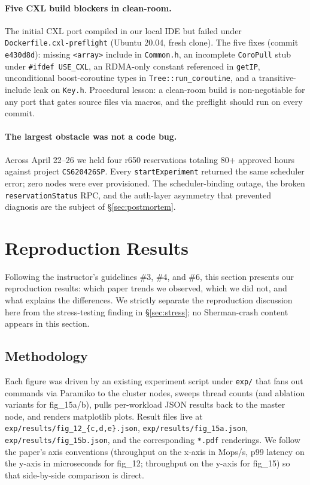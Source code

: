 \documentclass[11pt,a4paper]{article}
\begin{document}
\paragraph{Five CXL build blockers in clean-room.}\label{sec:effort-cxl} The initial CXL port compiled in our local IDE but failed under \texttt{Dockerfile.cxl-preflight} (Ubuntu 20.04, fresh clone). The five fixes (commit \texttt{e430d8d}): missing \texttt{<array>} include in \texttt{Common.h}, an incomplete \texttt{CoroPull} stub under \texttt{\#ifdef USE\_CXL}, an RDMA-only constant referenced in \texttt{getIP}, unconditional boost-coroutine types in \texttt{Tree::run\_coroutine}, and a transitive-include leak on \texttt{Key.h}. Procedural lesson: a clean-room build is non-negotiable for any port that gates source files via macros, and the preflight should run on every commit.

\paragraph{The largest obstacle was not a code bug.} Across April 22--26 we held four r650 reservations totaling 80+ approved hours against project \texttt{CS620426SP}. Every \texttt{startExperiment} returned the same scheduler error; zero nodes were ever provisioned. The scheduler-binding outage, the broken \texttt{reservationStatus} RPC, and the auth-layer asymmetry that prevented diagnosis are the subject of §\ref{sec:postmortem}.

\section{Reproduction Results}
\label{sec:repro}


Following the instructor's guidelines \#3, \#4, and \#6, this section presents our reproduction results: which paper trends we observed, which we did not, and what explains the differences. We strictly separate the reproduction discussion here from the stress-testing finding in §\ref{sec:stress}; no Sherman-crash content appears in this section.

\subsection{Methodology}

Each figure was driven by an existing experiment script under \texttt{exp/} that fans out commands via Paramiko to the cluster nodes, sweeps thread counts (and ablation variants for fig\_15a/b), pulls per-workload JSON results back to the master node, and renders matplotlib plots. Result files live at \texttt{exp/results/fig\_12\_\{c,d,e\}.json}, \texttt{exp/results/fig\_15a.json}, \texttt{exp/results/fig\_15b.json}, and the corresponding \texttt{*.pdf} renderings. We follow the paper's axis conventions (throughput on the x-axis in Mops/s, p99 latency on the y-axis in microseconds for fig\_12; throughput on the y-axis for fig\_15) so that side-by-side comparison is direct.
\end{document}
